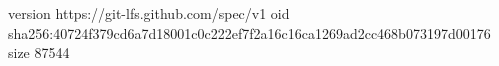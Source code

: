 version https://git-lfs.github.com/spec/v1
oid sha256:40724f379cd6a7d18001c0c222ef7f2a16c16ca1269ad2cc468b073197d00176
size 87544
